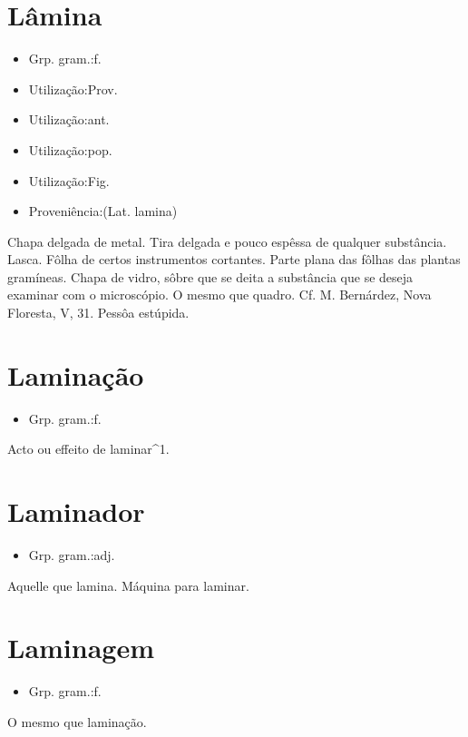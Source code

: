 \section{Lâmina}
\begin{itemize}
\item {Grp. gram.:f.}
\end{itemize}
\begin{itemize}
\item {Utilização:Prov.}
\end{itemize}
\begin{itemize}
\item {Utilização:ant.}
\end{itemize}
\begin{itemize}
\item {Utilização:pop.}
\end{itemize}
\begin{itemize}
\item {Utilização:Fig.}
\end{itemize}
\begin{itemize}
\item {Proveniência:(Lat. \textunderscore lamina\textunderscore )}
\end{itemize}
Chapa delgada de metal.
Tira delgada e pouco espêssa de qualquer substância.
Lasca.
Fôlha de certos instrumentos cortantes.
Parte plana das fôlhas das plantas gramíneas.
Chapa de vidro, sôbre que se deita a substância que se deseja examinar com o microscópio.
O mesmo que \textunderscore quadro\textunderscore . Cf. M. Bernárdez, \textunderscore Nova Floresta\textunderscore , V, 31.
Pessôa estúpida.
\section{Laminação}
\begin{itemize}
\item {Grp. gram.:f.}
\end{itemize}
Acto ou effeito de laminar^1.
\section{Laminador}
\begin{itemize}
\item {Grp. gram.:adj.}
\end{itemize}
Aquelle que lamina.
Máquina para laminar.
\section{Laminagem}
\begin{itemize}
\item {Grp. gram.:f.}
\end{itemize}
O mesmo que \textunderscore laminação\textunderscore .
